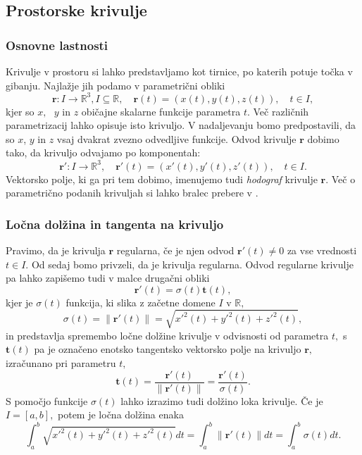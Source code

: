 \documentclass[12pt,a4paper,twoside]{article}
\theoremstyle{definition} %
\theoremstyle{plain} %
\theoremstyle{primerstyle}
\numberwithin{equation}{section}  %
\newcommand{\R}{\mathbb R}
\newcommand{\tV}{\mathbf{t}}
\newcommand{\rV}{\mathbf{r}}
\begin{document}
\subsection{Prostorske krivulje}
\subsubsection{Osnovne lastnosti}

Krivulje v prostoru si lahko predstavljamo kot tirnice, po katerih potuje točka v gibanju. Najlažje jih podamo
v parametrični obliki
\begin{equation*}
\rV:I \to \R^3, I \subseteq \R, \quad \rV(t)=(x(t),y(t),z(t)), \quad t \in I,
\end{equation*}
kjer so 
$x,\text{ } y \text{ in } z$ običajne skalarne funkcije parametra $t.$ Več različnih parametrizacij lahko opisuje
isto krivuljo. V nadaljevanju bomo predpostavili, da so $x$, $y$ in $z$ vsaj dvakrat zvezno odvedljive funkcije.
Odvod krivulje $\rV$ dobimo tako, da krivuljo odvajamo po komponentah:
$$\rV':I \to \R^3, \quad \rV'(t)=(x'(t),y'(t),z'(t)), \quad t \in I.$$
Vektorsko polje, ki ga pri tem dobimo, imenujemo tudi \textit{hodograf} krivulje $\rV.$ Več o parametrično podanih krivuljah si lahko bralec prebere v \cite{struik1961lectures}.

\subsubsection{Ločna dolžina in tangenta na krivuljo}

Pravimo, da je krivulja $\rV$ regularna, če je njen odvod $\rV'(t) \neq 0$ za vse vrednosti $t \in I.$ Od sedaj bomo privzeli, da je krivulja regularna. Odvod regularne krivulje pa lahko zapišemo tudi v malce drugačni obliki
\begin{equation}
	\label{eq2_1}
	\rV'(t)=\sigma(t)\tV(t),
\end{equation}
kjer je $\sigma(t)$ funkcija, ki slika z začetne domene $I$ v $\R,$
\begin{equation}
	\sigma(t)=\lVert \rV'(t)\rVert=\sqrt{x'^2(t)+y'^2(t)+z'^2(t)},
\end{equation}
in predstavlja spremembo ločne dolžine krivulje v odvisnosti od parametra $t,$ s $\tV(t)$ pa je označeno enotsko tangentsko vektorsko polje na krivuljo $\rV,$ izračunano pri parametru $t,$
\begin{equation}
	\label{enotski_tangentni_vektor}
	\tV(t)=\frac{\rV'(t)}{\lVert \rV'(t) \rVert}=
	\frac{\rV'(t)}{\sigma(t)}.
\end{equation}
S pomočjo funkcije $\sigma(t)$ lahko izrazimo tudi dolžino loka krivulje. Če je $I=[a,b],$ potem je ločna dolžina enaka
\begin{equation}
	\int_a^b\sqrt{x'^2(t)+y'^2(t)+z'^2(t)}dt=\int_a^b\lVert \rV'(t) \rVert dt =\int_a^b\sigma(t)dt.
\end{equation}
\end{document}

